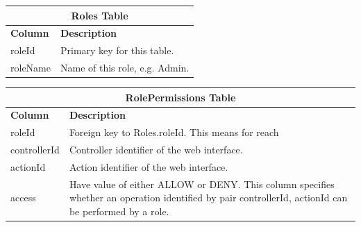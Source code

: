\begin{table}[h!]
\centering
\begin{tabular}{l p{12cm}}
\multicolumn{2}{c}{\bf Roles Table} \\ \hline
{\bf Column} & {\bf Description}\\ \hline
roleId & Primary key for this table.\\ \hline
roleName & Name of this role, e.g. Admin.\\ \hline
\end{tabular}
\end{table}

\begin{table}[h!]
\centering
\begin{tabular}{l p{12cm}}
\multicolumn{2}{c}{\bf RolePermissions Table} \\ \hline
{\bf Column} & {\bf Description}\\ \hline
roleId & Foreign key to Roles.roleId. This means for reach \\ \hline
controllerId & Controller identifier of the web interface.\\ \hline
actionId & Action identifier of the web interface.\\ \hline
access & Have value of either ALLOW or DENY. This column specifies whether an operation identified by pair {controllerId, actionId} can be performed by a role.\\ \hline
\end{tabular}
\end{table}
